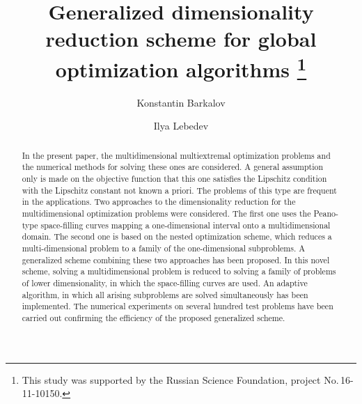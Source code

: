 \documentclass[runningheads]{llncs}
\begin{document}
%
\title{Generalized dimensionality reduction scheme for global optimization 
algorithms
\thanks{This study was supported by the Russian Science Foundation, project 
No.\,16-11-10150.}}
%
%
\author{Konstantin Barkalov %
\and Ilya Lebedev %
}
%
%
%
\maketitle              %
%
\begin{abstract}

In the present paper, the multidimensional multiextremal optimization 
problems and the numerical methods for solving these ones are considered. A 
general assumption only is made on the objective function that this one 
satisfies the Lipschitz condition with the Lipschitz constant not known 
a priori. The problems of this type are frequent in the applications. 
Two approaches to the dimensionality reduction for the multidimensional 
optimization problems were considered. The first one uses the Peano-type 
space-filling curves mapping a one-dimensional interval onto a multidimensional 
domain. The second one is based on the nested optimization scheme, which 
reduces a multi-dimensional problem to a family of the one-dimensional 
subproblems. A generalized scheme combining these two approaches has been 
proposed. In this novel scheme, solving a multidimensional problem is 
reduced to solving a family of problems of lower dimensionality, in 
which the space-filling curves are used. An adaptive algorithm, in which all 
arising subproblems are solved simultaneously has been implemented. The 
numerical experiments on several hundred test problems have been carried out 
confirming the efficiency of the proposed generalized scheme.

\end{abstract}
%
%
%
\end{document}
